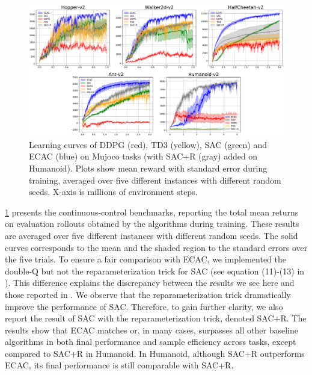 \begin{figure}[t]
\begin{center}
\includegraphics[width=0.7\linewidth]{./mujoco-results.pdf}
\end{center}
\caption{
Learning curves of DDPG (red), TD3 (yellow), SAC (green) and ECAC (blue) on
Mujoco tasks (with SAC+R (gray) added on Humanoid).
Plots show mean reward with standard error during training,
averaged over five different instances with different random seeds.
X-axis is millions of environment steps.
}
\label{fig:result-mujoco} 
\end{figure}

\cref{fig:result-mujoco} presents the 
continuous-control benchmarks, reporting the total mean returns
on evaluation rollouts obtained by the algorithms during training.
These
results are averaged over five different instances
with different random seeds.
The solid curves corresponds to the mean and the shaded region to the
standard errors over the five trials.
\if
To ensure a fair comparison with ECAC, we implemented the double-Q
but not the reparameterization trick for SAC 
(see equation (11)-(13) in \citep{haarnoja2018soft}).
This difference explains the discrepancy between the results we see here
and those reported in \citep{haarnoja2018soft}.
\fi
We observe that the reparameterization trick dramatically improve the performance of SAC. 
Therefore, to gain further clarity, 
we also report the result of SAC with the reparameterization trick,
denoted SAC+R.
The results show that ECAC matches or, in many cases, surpasses all other
baseline algorithms in both final performance and sample efficiency across
tasks, except compared to SAC+R in Humanoid.
In Humanoid, although SAC+R outperforms ECAC,
its final performance is still comparable with SAC+R.

